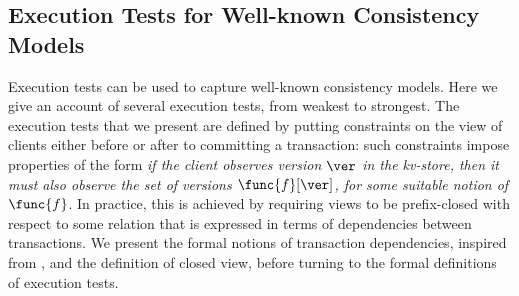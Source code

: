 % 
%


\subsection{Execution Tests for Well-known Consistency Models}\label{subsec:cm_examples}

Execution tests can be used to capture well-known consistency models. 
Here we give an account of several execution tests, from weakest 
to strongest.
The execution tests that we present are defined by 
putting constraints on the view of clients either before or after to committing a transaction: 
such constraints impose properties of the form \emph{if the client 
observes version $\ver$ in the kv-store, then it must also observe 
the set of versions $\func{f}[\ver]$, for some suitable notion of $\func{f}$}.
In practice, this is achieved by requiring views to be prefix-closed with respect 
to some relation that is expressed in terms of dependencies between transactions.
We present the formal notions of transaction dependencies, inspired from 
\cite{adya}, and the definition of closed view, before turning to the formal definitions
of execution tests. 

